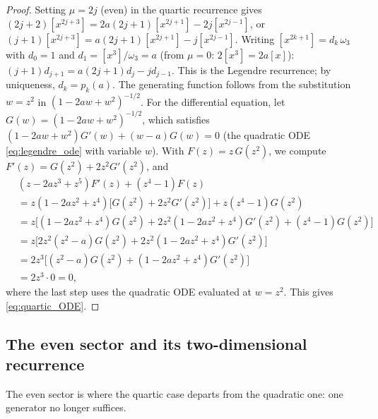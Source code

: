\documentclass[11pt]{amsart}
\theoremstyle{definition}
\theoremstyle{remark}
\begin{document}
\begin{proof}
Setting $\mu=2j$ (even) in the quartic recurrence gives
$(2j+2)[x^{2j+3}] = 2a(2j+1)[x^{2j+1}] - 2j[x^{2j-1}]$,
or $(j+1)[x^{2j+3}] = a(2j+1)[x^{2j+1}] - j[x^{2j-1}]$.
Writing $[x^{2k+1}] = d_k\,\omega_3$ with $d_0=1$ and
$d_1 = [x^3]/\omega_3 = a$ (from $\mu=0$: $2[x^3] = 2a[x]$):
$(j+1)d_{j+1} = a(2j+1)d_j - jd_{j-1}$.
This is the Legendre recurrence; by uniqueness, $d_k = p_k(a)$.
The generating function follows from the substitution $w=z^2$
in $(1-2aw+w^2)^{-1/2}$.
For the differential equation, let $G(w) = (1-2aw+w^2)^{-1/2}$, which satisfies
$(1-2aw+w^2)G'(w) + (w-a)G(w) = 0$
(the quadratic ODE \eqref{eq:legendre_ode} with variable $w$).
With $F(z) = z\,G(z^2)$, we compute $F'(z) = G(z^2)+2z^2G'(z^2)$, and
\begin{align*}
  &(z-2az^3+z^5)F'(z) + (z^4-1)F(z) \\
  &= z(1-2az^2+z^4)\bigl[G(z^2)+2z^2G'(z^2)\bigr]
     + z(z^4-1)G(z^2) \\
  &= z\bigl[(1-2az^2+z^4)G(z^2) + 2z^2(1-2az^2+z^4)G'(z^2)
     + (z^4-1)G(z^2)\bigr] \\
  &= z\bigl[2z^2(z^2-a)G(z^2) + 2z^2(1-2az^2+z^4)G'(z^2)\bigr] \\
  &= 2z^3\bigl[(z^2-a)G(z^2) + (1-2az^2+z^4)G'(z^2)\bigr] \\
  &= 2z^3 \cdot 0 = 0,
\end{align*}
where the last step uses the quadratic ODE evaluated at $w = z^2$.
This gives \eqref{eq:quartic_ODE}.
\end{proof}

\subsection{The even sector and its two-dimensional recurrence}

The even sector is where the quartic case departs from the quadratic one: one
generator no longer suffices.
\end{document}
